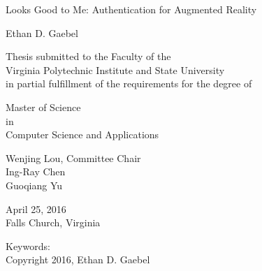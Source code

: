 \documentclass[12pt]{report}
\begin{document}
\thispagestyle{empty}
\begin{center}

{\Large 
Looks Good to Me: 
Authentication for Augmented Reality
}

\vfill

Ethan D. Gaebel

\vfill

Thesis submitted to the Faculty of the \\
Virginia Polytechnic Institute and State University \\
in partial fulfillment of the requirements for the degree of

\vfill

Master of Science \\
in \\
Computer Science and Applications

\vfill

Wenjing Lou, Committee Chair \\
Ing-Ray Chen \\
Guoqiang Yu 

\vfill

April 25, 2016 \\
Falls Church, Virginia

\vfill

Keywords: 
\\
Copyright 2016, Ethan D. Gaebel

\end{center}

\pagebreak
\end{document}
